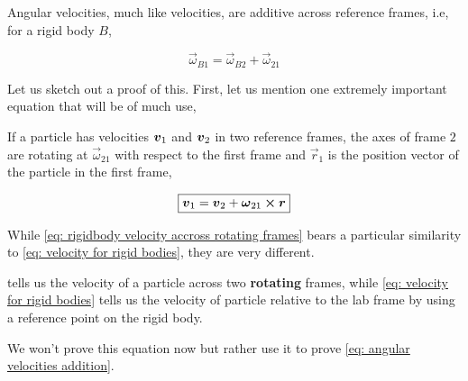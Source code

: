 Angular velocities, much like velocities, are additive across
reference frames, i.e, for a rigid body \(B\), 

\begin{equation}
    \label{eq: angular velocities addition}
    \boxed{\vec{\omega}_{B1} = \vec{\omega}_{B2} + \vec{\omega}_{21}}
\end{equation}

Let us sketch out a proof of this. First, let us mention 
one extremely important equation that will be of much use, 

If a particle has velocities \(\boldsymbol{v}_1\) and \(\boldsymbol{v}_2\) in two
reference frames, the axes of frame \(2\) are rotating 
at \(\vec{\omega}_{21}\) with respect to the first frame
and \(\vec{r}_1\) is the position vector of the particle in the first
frame,

\begin{equation}
    \label{eq: rigidbody velocity accross rotating frames}
    \boxed{\vv_{1} = \vv_2 + \vec{\omega}_{21} \cp \vec{r}}
\end{equation}

While \cref{eq: rigidbody velocity accross rotating frames} bears 
a particular similarity to \cref{eq: velocity for rigid bodies}, they are 
very different.

 tells us 
the velocity of a particle across two \textbf{rotating} frames,
while \cref{eq: velocity for rigid bodies} tells us the velocity 
of particle relative to the lab frame by using a reference point on the rigid body.

We won't prove this equation now but rather use it to prove \cref{eq: angular velocities addition}.

